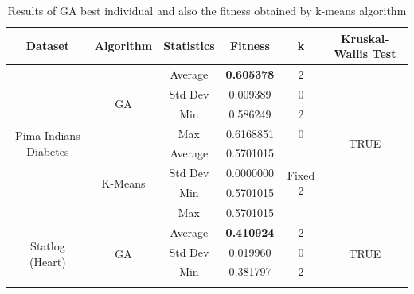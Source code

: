 \documentclass[journal]{IEEEtran}
\begin{document}
\begin{table}[]
	\centering
	\caption{Results of GA best individual and also the fitness obtained by k-means algorithm}
	\label{results-ga-and-kmeans}
	\begin{tabular}{|c|c|c|c|c|c|}
		\hline
		\textbf{Dataset}           & \textbf{Algorithm} & \textbf{Statistics} & \textbf{Fitness} & \textbf{k}    & \textbf{Kruskal-Wallis Test}   \\ \hline
		\multirow{8}{*}{Pima Indians Diabetes} & \multirow{4}{*}{GA}           & Average                        & \textbf{0.605378}                    & 2                        & \multirow{8}{*}{TRUE} \\ \cline{3-5}
		&                               & Std Dev                        & 0.009389                    & 0                        &                       \\ \cline{3-5}
		&                               & Min                            & 0.586249                    & 2                        &                       \\ \cline{3-5}
		&                               & Max                            & 0.6168851                   & 0                        &                       \\ \cline{2-5}
		& \multirow{4}{*}{K-Means}      & Average                        & 0.5701015                   & \multirow{4}{*}{Fixed 2} &                       \\ \cline{3-4}
		&                               & Std Dev                        & 0.0000000                   &                          &                       \\ \cline{3-4}
		&                               & Min                            & 0.5701015                   &                          &                       \\ \cline{3-4}
		&                               & Max                            & 0.5701015                   &                          &                       \\ \hline
		\multirow{8}{*}{Statlog (Heart)}       & \multirow{4}{*}{GA}           & Average                        & \textbf{0.410924}                    & 2                        & \multirow{8}{*}{TRUE} \\ \cline{3-5}
		&                               & Std Dev                        & 0.019960                    & 0                        &                       \\ \cline{3-5}
		&                               & Min                            & 0.381797                    & 2                        &                       \\ \cline{3-5}

\end{tabular}
\end{table}
\end{document}
